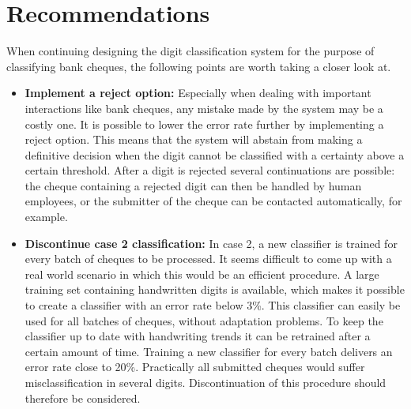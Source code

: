 \section{Recommendations}
\label{sec:recom}

When continuing designing the digit classification system for the purpose of classifying bank cheques, the following points are worth taking a closer look at. 
\begin{itemize}
	\item \textbf{Implement a reject option:} Especially when dealing with important interactions like bank cheques, any mistake made by the system may be a costly one. It is possible to lower the error rate further by implementing a reject option. This means that the system will abstain from making a definitive decision when the digit cannot be classified with a certainty above a certain threshold. After a digit is rejected several continuations are possible: the cheque containing a rejected digit can then be handled by human employees, or the submitter of the cheque can be contacted automatically, for example.	
	\item \textbf{Discontinue case 2 classification:} In case 2, a new classifier is trained for every batch of cheques to be processed. It seems difficult to come up with a real world scenario in which this would be an efficient procedure. A large training set containing handwritten digits is available, which makes it possible to create a classifier with an error rate below 3\%. This classifier can easily be used for all batches of cheques, without adaptation problems. To keep the classifier up to date with handwriting trends it can be retrained after a certain amount of time. 
	Training a new classifier for every batch delivers an error rate close to 20\%. Practically all submitted cheques would suffer misclassification in several digits. Discontinuation of this procedure should therefore be considered.
	

\end{itemize}

